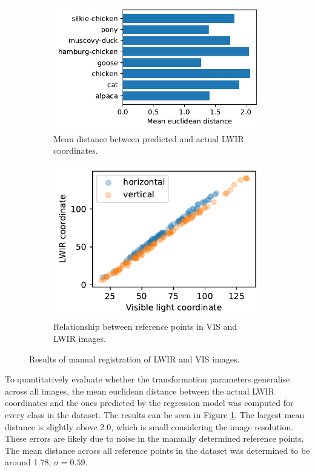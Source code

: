 \documentclass{l4proj}
\begin{document}
\begin{figure}[ht]
  \centering
  \begin{subfigure}[t]{0.45\textwidth}
    \includegraphics[width=\textwidth]{images/registration/error}
    \caption{Mean distance between predicted and actual LWIR coordinates.}
    \label{fig:registration_error}
  \end{subfigure}
  \quad
  \begin{subfigure}[t]{0.368\textwidth}
    \includegraphics[width=\textwidth]{images/registration/x_y}
    \caption{Relationship between reference points in VIS and LWIR images.}
    \label{fig:registration_relationship}
  \end{subfigure}
  \caption{Results of manual registration of LWIR and VIS images.}
\end{figure}

To quantitatively evaluate whether the transformation parameters generalise across all images, the mean euclidean distance between the actual LWIR coordinates and the ones predicted by the regression model was computed for every class in the dataset. The results can be seen in Figure \ref{fig:registration_error}. The largest mean distance is slightly above 2.0, which is small considering the image resolution. These errors are likely due to noise in the manually determined reference points. The mean distance across all reference points in the dataset was determined to be around 1.78, $\sigma = 0.59$.
\end{document}
